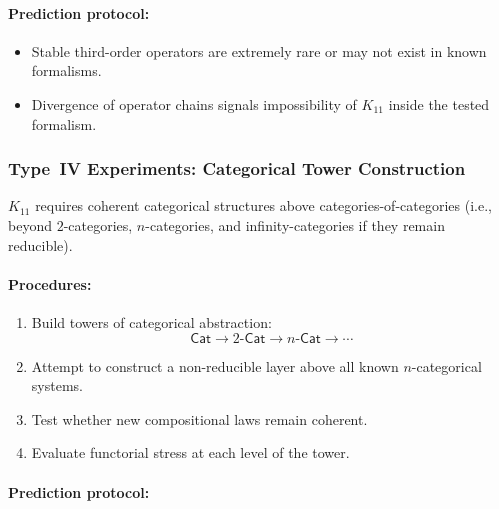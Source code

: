 \paragraph{Prediction protocol:}

\begin{itemize}
    \item Stable third-order operators are extremely rare or may not
          exist in known formalisms.
    \item Divergence of operator chains signals impossibility of
          $K_{11}$ inside the tested formalism.
\end{itemize}



\subsubsection{Type~IV Experiments: Categorical Tower Construction}

$K_{11}$ requires coherent categorical structures above
categories-of-categories (i.e., beyond $2$-categories, $n$-categories,
and infinity-categories if they remain reducible).

\paragraph{Procedures:}

\begin{enumerate}
    \item Build towers of categorical abstraction:
          \[
              \mathsf{Cat}
              \rightarrow
              2\text{-}\mathsf{Cat}
              \rightarrow
              n\text{-}\mathsf{Cat}
              \rightarrow
              \cdots
          \]
    \item Attempt to construct a non-reducible layer above all
          known $n$-categorical systems.
    \item Test whether new compositional laws remain coherent.
    \item Evaluate functorial stress at each level of the tower.
\end{enumerate}

\paragraph{Prediction protocol:}

